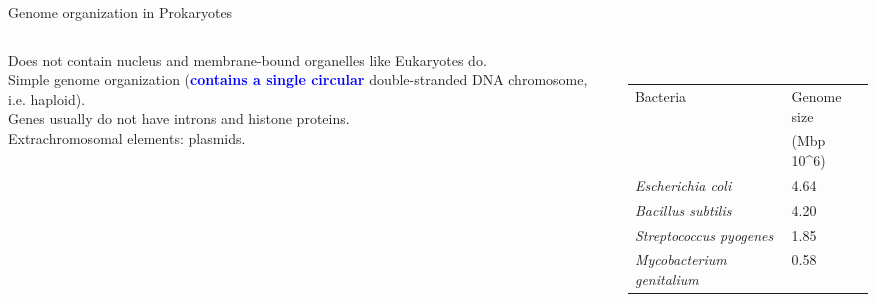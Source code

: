 \documentclass{beamer}
\renewcommand{\c}[1]{\begin{center}#1\end{center}}
\newcommand{\blu}[1]{\textcolor{blue}{\textbf{#1}}}
\newcommand{\gr}[2][.95]{\c{\texttt{[image: \#2]}}}
\begin{document}
\begin{frame}{Genome organization in Prokaryotes}
\begin{columns}
\begin{column}{0.6\textwidth}
    Does not contain nucleus and membrane-bound organelles like Eukaryotes do.\\
    \bigskip
    Simple genome organization (\blu{contains a single circular} double-stranded DNA chromosome, i.e. haploid).\\
    \bigskip
    Genes usually do not have introns and histone proteins.\\
    \bigskip
    Extrachromosomal elements: plasmids.
\end{column}
\begin{column}{0.4\textwidth}
\c{
    \fbox{\gr{l1_figs/s8_prok.png}}\\
    \bigskip
    \tiny
    \begin{tabular}{|l|l|}
        \hline
        Bacteria & Genome size\\
        & (Mbp 10^6)\\
        \hline
        \textit{Escherichia coli} & 4.64\\
        \textit{Bacillus subtilis} & 4.20\\
        \textit{Streptococcus pyogenes} & 1.85\\
        \textit{Mycobacterium genitalium} & 0.58\\
        \hline
    \end{tabular}
}
\end{column}\end{columns}
\end{frame}
\end{document}
